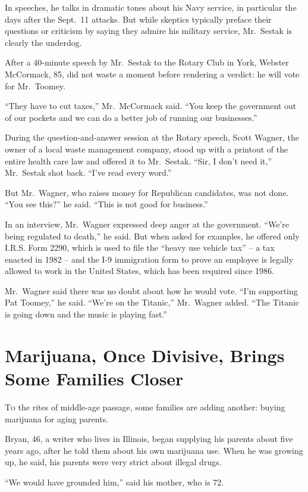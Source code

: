 ﻿\documentclass[12pt]{article}
\begin{document}
In speeches, he talks in dramatic tones about his Navy service, in particular the days after the
Sept.~11 attacks. But while skeptics typically preface their questions or criticism by saying they
admire his military service, Mr.~Sestak is clearly the underdog.

After a 40-minute speech by Mr.~Sestak to the Rotary Club in York, Webster McCormack, 85, did not
waste a moment before rendering a verdict: he will vote for Mr.~Toomey.

``They have to cut taxes,'' Mr.~McCormack said. ``You keep the government out of our pockets and we
can do a better job of running our businesses.''

During the question-and-answer session at the Rotary speech, Scott Wagner, the owner of a local
waste management company, stood up with a printout of the entire health care law and offered it to
Mr.~Sestak. ``Sir, I don't need it,'' Mr.~Sestak shot back. ``I've read every word.''

But Mr.~Wagner, who raises money for Republican candidates, was not done. ``You see this?'' he said.
``This is not good for business.''

In an interview, Mr.~Wagner expressed deep anger at the government. ``We're being regulated to
death,'' he said. But when asked for examples, he offered only I.R.S. Form 2290, which is used to
file the ``heavy use vehicle tax'' -- a tax enacted in 1982 -- and the I-9 immigration form to prove
an employee is legally allowed to work in the United States, which has been required since 1986.

Mr.~Wagner said there was no doubt about how he would vote. ``I'm supporting Pat Toomey,'' he said.
``We're on the Titanic,'' Mr.~Wagner added. ``The Titanic is going down and the music is playing
fast.''

\section{Marijuana, Once Divisive, Brings Some Families Closer}

\lettrine{T}{o} the rites of middle-age passage, some families are adding
another: buying marijuana for aging parents.

Bryan, 46, a writer who lives in Illinois, began supplying his parents about five years ago, after
he told them about his own marijuana use. When he was growing up, he said, his parents were very
strict about illegal drugs.

``We would have grounded him,'' said his mother, who is 72.
\end{document}
